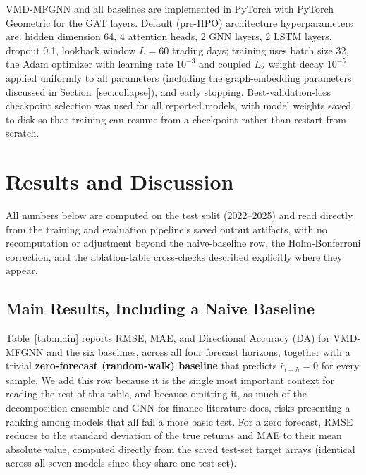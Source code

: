 \documentclass[journal]{IEEEtran}
\begin{document}
VMD-MFGNN and all baselines are implemented in PyTorch with PyTorch Geometric for the GAT layers. Default (pre-HPO) architecture hyperparameters are: hidden dimension 64, 4 attention heads, 2 GNN layers, 2 LSTM layers, dropout 0.1, lookback window $L=60$ trading days; training uses batch size 32, the Adam optimizer with learning rate $10^{-3}$ and coupled $L_2$ weight decay $10^{-5}$ applied uniformly to all parameters (including the graph-embedding parameters discussed in Section~\ref{sec:collapse}), and early stopping. Best-validation-loss checkpoint selection was used for all reported models, with model weights saved to disk so that training can resume from a checkpoint rather than restart from scratch.

\section{Results and Discussion}
\label{sec:results}

All numbers below are computed on the test split (2022--2025) and read directly from the training and evaluation pipeline's saved output artifacts, with no recomputation or adjustment beyond the naive-baseline row, the Holm-Bonferroni correction, and the ablation-table cross-checks described explicitly where they appear.

\subsection{Main Results, Including a Naive Baseline}
\label{sec:main-results}

Table~\ref{tab:main} reports RMSE, MAE, and Directional Accuracy (DA) for VMD-MFGNN and the six baselines, across all four forecast horizons, together with a trivial \textbf{zero-forecast (random-walk) baseline} that predicts $\hat r_{t+h}=0$ for every sample. We add this row because it is the single most important context for reading the rest of this table, and because omitting it, as much of the decomposition-ensemble and GNN-for-finance literature does, risks presenting a ranking among models that all fail a more basic test. For a zero forecast, RMSE reduces to the standard deviation of the true returns and MAE to their mean absolute value, computed directly from the saved test-set target arrays (identical across all seven models since they share one test set).
\end{document}
